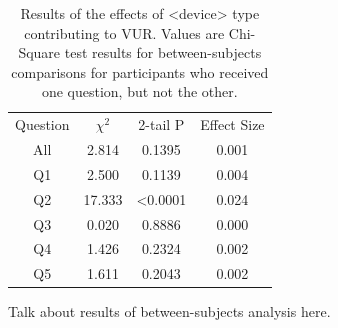 \documentclass{acm_proc_article-sp}
\begin{document}
\begin{table}%
\begin{center}
\begin{tabular}{| c | c | c | c |}
Question & $\chi^2$ &	2-tail P & Effect Size\\
All & 2.814 & 0.1395 & 0.001\\
Q1 & 2.500 & 0.1139 & 0.004\\
Q2 & 17.333 & <0.0001 & 0.024\\
Q3 & 0.020 & 0.8886 & 0.000\\
Q4 & 1.426 & 0.2324 & 0.002\\
Q5 & 1.611 & 0.2043 & 0.002\\
\end{tabular}
\caption{Results of the effects of <device> type contributing to VUR. Values are Chi-Square test results for between-subjects comparisons for participants who received one question, but not the other.}
\label{betweendevice}
\end{center}
\end{table}

Talk about results of between-subjects analysis here. 
						
\end{document}
